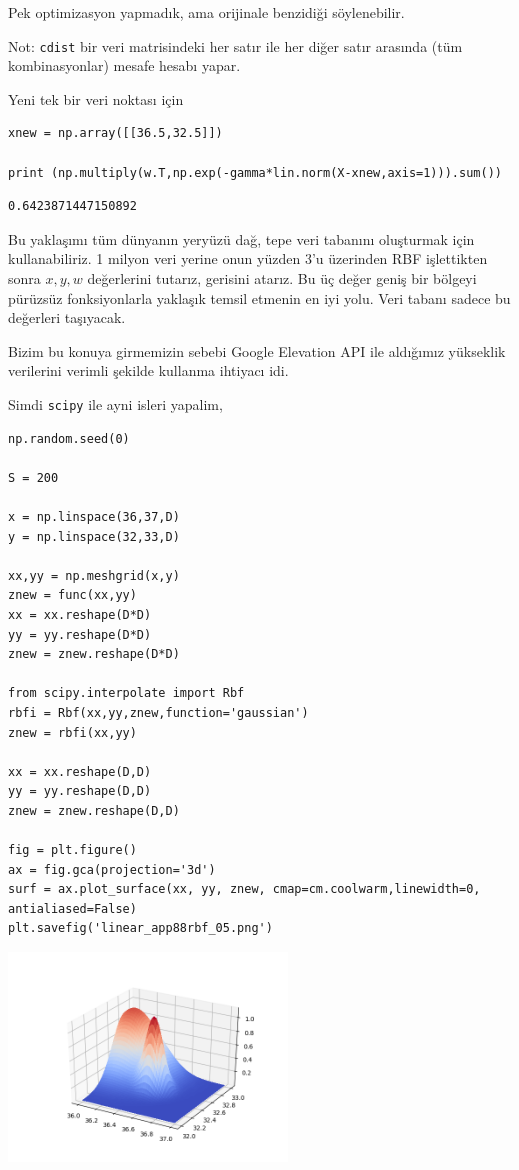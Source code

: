 \documentclass[12pt,fleqn]{article}\usepackage{../../common}
\begin{document}
Pek optimizasyon yapmadık, ama orijinale benzidiği söylenebilir.

Not: \verb!cdist! bir veri matrisindeki her satır ile her diğer satır arasında
(tüm kombinasyonlar) mesafe hesabı yapar.

Yeni tek bir veri noktası için

\begin{verbatim}
xnew = np.array([[36.5,32.5]])

print (np.multiply(w.T,np.exp(-gamma*lin.norm(X-xnew,axis=1))).sum())
\end{verbatim}

\begin{verbatim}
0.6423871447150892
\end{verbatim}

Bu yaklaşımı tüm dünyanın yeryüzü dağ, tepe veri tabanını oluşturmak için
kullanabiliriz. 1 milyon veri yerine onun yüzden 3'u üzerinden RBF işlettikten
sonra $x,y,w$ değerlerini tutarız, gerisini atarız. Bu üç değer geniş bir
bölgeyi pürüzsüz fonksiyonlarla yaklaşık temsil etmenin en iyi yolu. Veri tabanı
sadece bu değerleri taşıyacak.

Bizim bu konuya girmemizin sebebi Google Elevation API ile aldığımız yükseklik
verilerini verimli şekilde kullanma ihtiyacı idi.

Simdi \verb!scipy! ile ayni isleri yapalim,

\begin{verbatim}
np.random.seed(0)

S = 200

x = np.linspace(36,37,D)
y = np.linspace(32,33,D)

xx,yy = np.meshgrid(x,y)
znew = func(xx,yy)
xx = xx.reshape(D*D)
yy = yy.reshape(D*D)
znew = znew.reshape(D*D)

from scipy.interpolate import Rbf
rbfi = Rbf(xx,yy,znew,function='gaussian')
znew = rbfi(xx,yy)

xx = xx.reshape(D,D)
yy = yy.reshape(D,D)
znew = znew.reshape(D,D)

fig = plt.figure()
ax = fig.gca(projection='3d')
surf = ax.plot_surface(xx, yy, znew, cmap=cm.coolwarm,linewidth=0, antialiased=False)
plt.savefig('linear_app88rbf_05.png')
\end{verbatim}

\includegraphics[width=20em]{linear_app88rbf_05.png}
\end{document}

